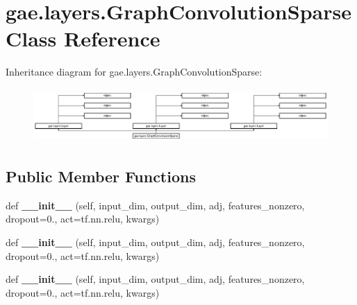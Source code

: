 \hypertarget{classgae_1_1layers_1_1GraphConvolutionSparse}{}\section{gae.\+layers.\+Graph\+Convolution\+Sparse Class Reference}
\label{classgae_1_1layers_1_1GraphConvolutionSparse}
Inheritance diagram for gae.\+layers.\+Graph\+Convolution\+Sparse\+:\begin{figure}[H]
\begin{center}
\leavevmode
\includegraphics[height=2.064897cm]{classgae_1_1layers_1_1GraphConvolutionSparse}
\end{center}
\end{figure}
\subsection*{Public Member Functions}
\begin{DoxyCompactItemize}
\item 
\mbox{\label{classgae_1_1layers_1_1GraphConvolutionSparse_a1986dee396baba614cf86f3b2796cc75}} 
def {\bfseries \+\_\+\+\_\+init\+\_\+\+\_\+} (self, input\+\_\+dim, output\+\_\+dim, adj, features\+\_\+nonzero, dropout=0., act=tf.\+nn.\+relu, kwargs)
\item 
\mbox{\label{classgae_1_1layers_1_1GraphConvolutionSparse_a1986dee396baba614cf86f3b2796cc75}} 
def {\bfseries \+\_\+\+\_\+init\+\_\+\+\_\+} (self, input\+\_\+dim, output\+\_\+dim, adj, features\+\_\+nonzero, dropout=0., act=tf.\+nn.\+relu, kwargs)
\item 
\mbox{\label{classgae_1_1layers_1_1GraphConvolutionSparse_a1986dee396baba614cf86f3b2796cc75}} 
def {\bfseries \+\_\+\+\_\+init\+\_\+\+\_\+} (self, input\+\_\+dim, output\+\_\+dim, adj, features\+\_\+nonzero, dropout=0., act=tf.\+nn.\+relu, kwargs)
\end{DoxyCompactItemize}
